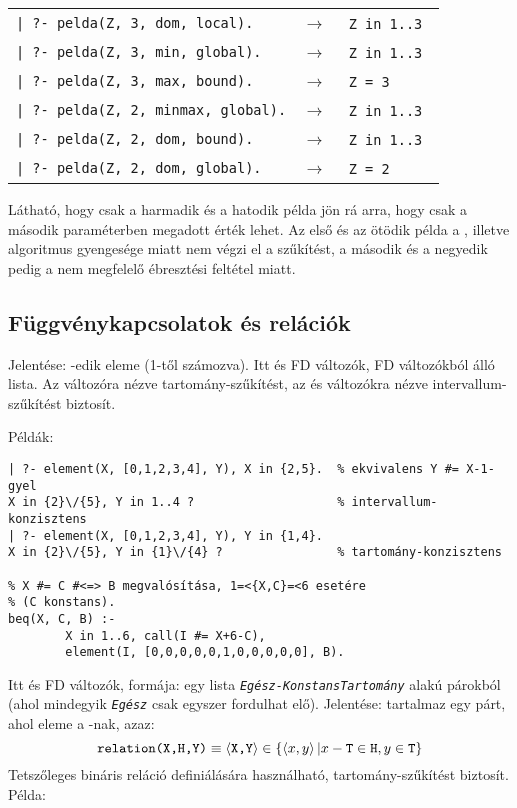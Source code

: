\begin{tabular}{ll}
\verb'| ?- pelda(Z, 3, dom, local).'    & $\rightarrow$ \verb'  Z in 1..3 '  \\
\verb'| ?- pelda(Z, 3, min, global).'   & $\rightarrow$ \verb'  Z in 1..3 '  \\
\verb'| ?- pelda(Z, 3, max, bound).'    & $\rightarrow$ \verb'  Z = 3     '  \\
\verb'| ?- pelda(Z, 2, minmax, global).'& $\rightarrow$ \verb'  Z in 1..3 '  \\
\verb'| ?- pelda(Z, 2, dom, bound).'    & $\rightarrow$ \verb'  Z in 1..3 '  \\
\verb'| ?- pelda(Z, 2, dom, global).'   & $\rightarrow$ \verb'  Z = 2     '  \\
\end{tabular}
\br
Látható, hogy csak a harmadik és a hatodik példa jön rá arra, hogy  csak
a második paraméterben megadott érték lehet. Az első és az ötödik példa a ,
illetve  algoritmus gyengesége miatt nem végzi el a szűkítést, a második
és a negyedik pedig a nem megfelelő ébresztési feltétel miatt.

\subsection{Függvénykapcsolatok és relációk}

{}

Jelentése:  -edik eleme  (1-től számozva). Itt  és 
FD változók,  FD változókból álló lista. Az  változóra nézve
tartomány-szűkítést, az  és  változókra nézve intervallum-szűkítést
biztosít. 

Példák: 

\begin{verbatim}
| ?- element(X, [0,1,2,3,4], Y), X in {2,5}.  % ekvivalens Y #= X-1-gyel
X in {2}\/{5}, Y in 1..4 ?                    % intervallum-konzisztens
| ?- element(X, [0,1,2,3,4], Y), Y in {1,4}.
X in {2}\/{5}, Y in {1}\/{4} ?                % tartomány-konzisztens

% X #= C #<=> B megvalósítása, 1=<{X,C}=<6 esetére
% (C konstans).
beq(X, C, B) :- 
        X in 1..6, call(I #= X+6-C), 
        element(I, [0,0,0,0,0,1,0,0,0,0,0], B).
\end{verbatim}

\medskip
{}

Itt  és  FD változók,  formája: egy lista
{\tt\em Egész-KonstansTartomány} alakú párokból (ahol mindegyik {\tt\em Egész}
csak egyszer fordulhat elő). Jelentése:  tartalmaz egy  párt,
ahol  eleme a -nak, azaz: \[ \texttt{relation(X,H,Y)} \equiv \left\langle\texttt{X,Y}\right\rangle
\in \{\left\langle x,y\right\rangle|x-\texttt{T} \in \texttt{H}, y \in \texttt{T}\}\] Tetszőleges bináris reláció
definiálására használható, tartomány-szűkítést biztosít. Példa:

